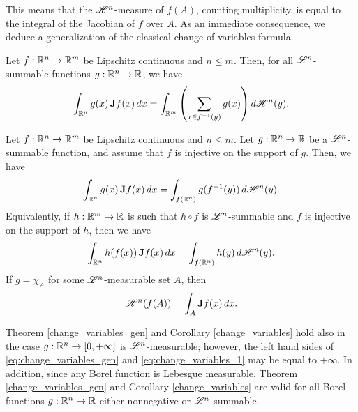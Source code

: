 This means that the $\mathscr{H}^{n}$-measure of $f(A)$, counting multiplicity, is equal to the integral of the Jacobian of $f$ over $A$. As an immediate consequence, we deduce a generalization of the classical change of variables formula.

\begin{theorem} \label{change_variables_gen}
Let $f : \mathbb{R}^{n} \to \mathbb{R}^{m}$ be Lipschitz continuous and $n \le m$. Then, for all $\mathscr{L}^{n}$-summable functions $g : \mathbb{R}^{n} \to \mathbb{R}$, we have
\begin{equation} \label{eq:change_variables_gen}
\int_{\mathbb{R}^{n}} g(x) \, {\bf J} f(x) \, dx = \int_{\mathbb{R}^{m}} \left (\sum_{x \in f^{-1}(y)} g(x) \right ) d \mathscr{H}^{n}(y).
\end{equation}
\end{theorem}

\begin{corollary} \label{change_variables}
Let $f : \mathbb{R}^{n} \to \mathbb{R}^{m}$ be Lipschitz continuous and $n \le m$. Let $g : \mathbb{R}^{n} \to \mathbb{R}$ be a $\mathscr{L}^{n}$-summable function, and assume that $f$ is injective on the support of $g$. Then, we have
\begin{equation} \label{eq:change_variables_1}
\int_{\mathbb{R}^{n}} g(x) \, {\bf J} f(x) \, dx = \int_{f(\mathbb{R}^{n})} g(f^{-1}(y)) \, d \mathscr{H}^{n}(y).
\end{equation}
Equivalently, if $h : \mathbb{R}^{m} \to \mathbb{R}$ is such that $h \circ f$ is $\mathscr{L}^{n}$-summable and $f$ is injective on the support of $h$, then we have
\begin{equation} \label{eq:change_variables_2}
\int_{\mathbb{R}^{n}} h(f(x)) \, {\bf J} f(x) \, dx = \int_{f(\mathbb{R}^{n})} h(y) \, d \mathscr{H}^{n}(y).
\end{equation}
If $g = \chi_{A}$ for some $\mathscr{L}^{n}$-measurable set $A$, then
\begin{equation} \label{eq:area_formula_inj}
\mathscr{H}^{n}(f(A)) = \int_{A} {\bf J} f(x) \, dx.
\end{equation}
\end{corollary}

\begin{remark}
Theorem \ref{change_variables_gen} and Corollary \ref{change_variables} hold also in the case $g : \mathbb{R}^{n} \to [0, + \infty]$ is $\mathscr{L}^{n}$-measurable; however, the left hand sides of \eqref{eq:change_variables_gen} and \eqref{eq:change_variables_1} may be equal to $+ \infty$.
In addition, since any Borel function is Lebesgue measurable, Theorem \ref{change_variables_gen} and Corollary \ref{change_variables} are valid for all Borel functions $g : \mathbb{R}^{n} \to \mathbb{R}$ either nonnegative or $\mathscr{L}^{n}$-summable.
\end{remark}

